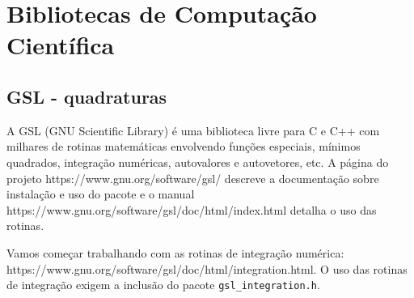 \chapter{Bibliotecas de Computação Científica}

\section{GSL - quadraturas}
A GSL (GNU Scientific Library) é uma biblioteca livre para C e C++ com milhares de rotinas matemáticas envolvendo funções especiais, mínimos quadrados, integração numéricas, autovalores e autovetores, etc. A página do projeto  https://www.gnu.org/software/gsl/ descreve a documentação sobre instalação e uso do pacote e o manual https://www.gnu.org/software/gsl/doc/html/index.html detalha o uso das rotinas.

Vamos começar trabalhando com as rotinas de integração numérica: https://www.gnu.org/software/gsl/doc/html/integration.html. O uso das rotinas de integração exigem a inclusão do pacote \verb|gsl_integration.h|.

